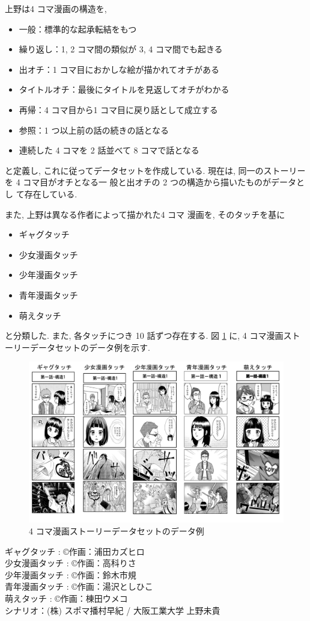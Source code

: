 上野は4 コマ漫画の構造を,

\begin{itemize}
  \item 一般：標準的な起承転結をもつ
  \item 繰り返し：1, 2 コマ間の類似が 3, 4 コマ間でも起きる
  \item 出オチ：1 コマ目におかしな絵が描かれてオチがある
  \item タイトルオチ：最後にタイトルを見返してオチがわかる
  \item 再帰：4 コマ目から1 コマ目に戻り話として成立する
  \item 参照：1 つ以上前の話の続きの話となる
  \item 連続した 4 コマを 2 話並べて 8 コマで話となる
\end{itemize}

と定義し, これに従ってデータセットを作成している.
現在は, 同一のストーリーを 4 コマ目がオチとなる一
般と出オチの 2 つの構造から描いたものがデータとし
て存在している.

また, 上野は異なる作者によって描かれた4 コマ
漫画を, そのタッチを基に

\begin{itemize}
  \item ギャグタッチ
  \item 少女漫画タッチ
  \item 少年漫画タッチ
  \item 青年漫画タッチ
  \item 萌えタッチ
\end{itemize}

と分類した. また, 各タッチにつき 10 話ずつ存在する. 図 \ref{fig:4koma_data} に,
4 コマ漫画ストーリーデータセットのデータ例を示す.

\newpage
\begin{figure}[!h]
  \centering
  \includegraphics[width=0.8\hsize]{doc/figures/4koma_data.png}
  \caption{4 コマ漫画ストーリーデータセットのデータ例}
  \label{fig:4koma_data}
\end{figure}

\begin{flushleft}
\begin{center}
ギャグタッチ : \copyright 作画：浦田カズヒロ \\
少女漫画タッチ : \copyright 作画：高科りさ \\
少年漫画タッチ : \copyright 作画：鈴木市規 \\
青年漫画タッチ : \copyright 作画：湯沢としひこ \\
萌えタッチ : \copyright 作画：棟田ウメコ \\
シナリオ：(株) スポマ播村早紀 / 大阪工業大学 上野未貴 \\
\end{center}
\end{flushleft}
